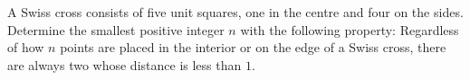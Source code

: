 A Swiss cross consists of five unit squares, one in the centre and four on the sides.
Determine the smallest positive integer $n$ with the following property:
Regardless of how $n$ points are placed in the interior or on the edge of a Swiss cross,
there are always two whose distance is less than $1$.